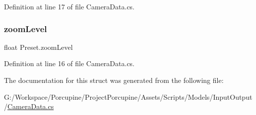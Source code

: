Definition at line 17 of file Camera\+Data.\+cs.

\mbox{\label{struct_preset_aff492ab19d9adb5babd2cb9f30b8d9d4}} 
\subsubsection{\texorpdfstring{zoom\+Level}{zoomLevel}}
{\footnotesize\ttfamily float Preset.\+zoom\+Level}



Definition at line 16 of file Camera\+Data.\+cs.



The documentation for this struct was generated from the following file\+:\begin{DoxyCompactItemize}
\item 
G\+:/\+Workspace/\+Porcupine/\+Project\+Porcupine/\+Assets/\+Scripts/\+Models/\+Input\+Output/\hyperlink{_camera_data_8cs}{Camera\+Data.\+cs}\end{DoxyCompactItemize}
